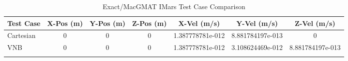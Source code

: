 \begin{table}[htbp!]
\centering
\caption{ Exact/MacGMAT IMars Test Case Comparison}
      \begin{tabular}{lcccccc}
      \hline\hline
          Test Case & X-Pos (m) & Y-Pos (m) & Z-Pos (m) & X-Vel (m/s) & Y-Vel (m/s) & Z-Vel (m/s) \\
         \hline
         Cartesian & 0 & 0 & 0 & 1.387778781e-012 & 8.881784197e-013 & 0 \\
         VNB & 0 & 0 & 0 & 1.387778781e-012 & 3.108624469e-012 & 8.881784197e-013 \\
      \hline\hline
      \label{Table: IMars Exact-MacGMAT Table} 
\end{tabular}
\end{table}

